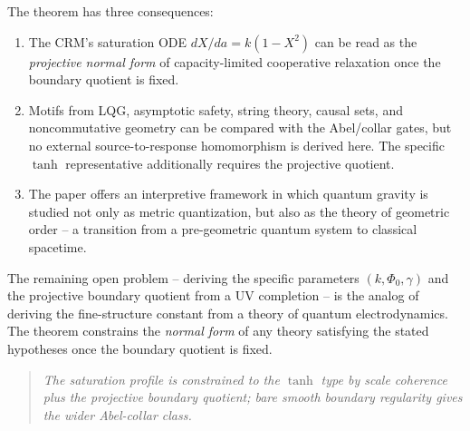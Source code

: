 \documentclass[aps,prd,twocolumn,superscriptaddress,nofootinbib]{revtex4-2}
\begin{document}
The theorem has three consequences:

\begin{enumerate}
\item The CRM's saturation ODE $dX/da = k(1-X^2)$ can be read as the \textit{projective normal form} of capacity-limited cooperative relaxation once the boundary quotient is fixed.

\item Motifs from LQG, asymptotic safety, string theory, causal sets, and noncommutative geometry can be compared with the Abel/collar gates, but no external source-to-response homomorphism is derived here. The specific $\tanh$ representative additionally requires the projective quotient.

\item The paper offers an interpretive framework in which quantum gravity is studied not only as metric quantization, but also as the theory of geometric order -- a transition from a pre-geometric quantum system to classical spacetime.
\end{enumerate}

The remaining open problem -- deriving the specific parameters $(k, \Phi_0, \gamma)$ and the projective boundary quotient from a UV completion -- is the analog of deriving the fine-structure constant from a theory of quantum electrodynamics. The theorem constrains the \textit{normal form} of any theory satisfying the stated hypotheses once the boundary quotient is fixed.

\begin{quote}
\textit{The saturation profile is constrained to the $\tanh$ type by scale coherence plus the projective boundary quotient; bare smooth boundary regularity gives the wider Abel-collar class.}
\end{quote}
\end{document}
